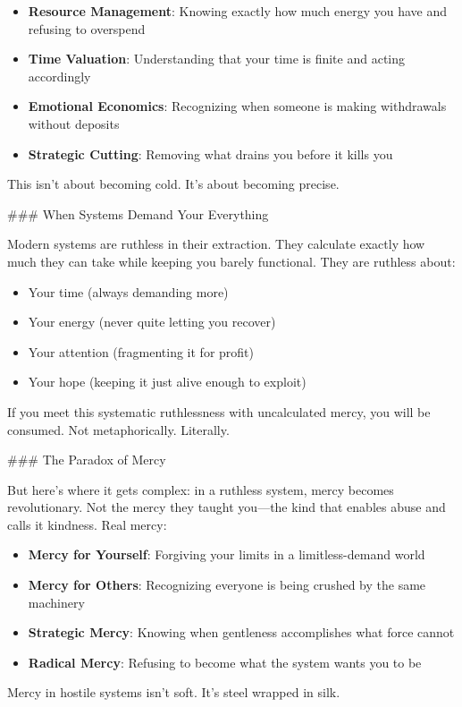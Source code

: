 \documentclass[12pt]{book}
\begin{document}
\begin{itemize}
\item \textbf{Resource Management}: Knowing exactly how much energy you have and refusing to overspend
\item \textbf{Time Valuation}: Understanding that your time is finite and acting accordingly
\item \textbf{Emotional Economics}: Recognizing when someone is making withdrawals without deposits
\item \textbf{Strategic Cutting}: Removing what drains you before it kills you

\end{itemize}
This isn't about becoming cold. It's about becoming precise.

\#\#\# When Systems Demand Your Everything

Modern systems are ruthless in their extraction. They calculate exactly how much they can take while keeping you barely functional. They are ruthless about:

\begin{itemize}
\item Your time (always demanding more)
\item Your energy (never quite letting you recover)
\item Your attention (fragmenting it for profit)
\item Your hope (keeping it just alive enough to exploit)

\end{itemize}
If you meet this systematic ruthlessness with uncalculated mercy, you will be consumed. Not metaphorically. Literally.

\#\#\# The Paradox of Mercy

But here's where it gets complex: in a ruthless system, mercy becomes revolutionary. Not the mercy they taught you—the kind that enables abuse and calls it kindness. Real mercy:

\begin{itemize}
\item \textbf{Mercy for Yourself}: Forgiving your limits in a limitless-demand world
\item \textbf{Mercy for Others}: Recognizing everyone is being crushed by the same machinery
\item \textbf{Strategic Mercy}: Knowing when gentleness accomplishes what force cannot
\item \textbf{Radical Mercy}: Refusing to become what the system wants you to be

\end{itemize}
Mercy in hostile systems isn't soft. It's steel wrapped in silk.
\end{document}
